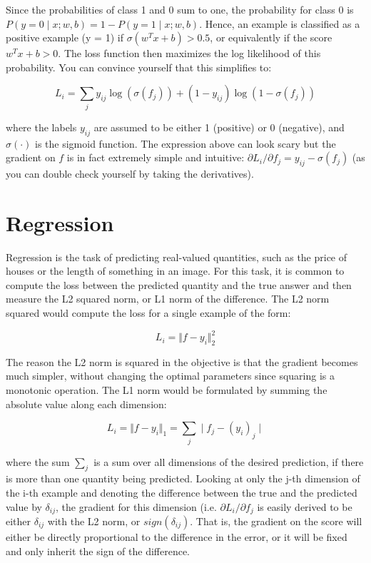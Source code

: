Since the probabilities of class 1 and 0 sum to one, the probability for class 0 is $P(y = 0 \mid x; w, b) = 1 - P(y = 1 \mid x; w,b)$. Hence, an example is classified as a positive example (y = 1) if $\sigma (w^Tx + b) > 0.5$, or equivalently if the score $w^Tx +b > 0$. The loss function then maximizes the log likelihood of this probability. You can convince yourself that this simplifies to:

\begin{equation}
L_i = \sum_j y_{ij} \log(\sigma(f_j)) + (1 - y_{ij}) \log(1 - \sigma(f_j))
\end{equation}

where the labels $y_{ij}$ are assumed to be either 1 (positive) or 0 (negative), and $\sigma(\cdot)$ is the sigmoid function. The expression above can look scary but the gradient on $f$ is in fact extremely simple and intuitive: $\partial{L_i} / \partial{f_j} = y_{ij} - \sigma(f_j)$ (as you can double check yourself by taking the derivatives).

\section*{Regression}
Regression is the task of predicting real-valued quantities, such as the price of houses or the length of something in an image. For this task, it is common to compute the loss between the predicted quantity and the true answer and then measure the L2 squared norm, or L1 norm of the difference. The L2 norm squared would compute the loss for a single example of the form:

\begin{equation}
L_i = \Vert f - y_i \Vert_2^2
\end{equation}

The reason the L2 norm is squared in the objective is that the gradient becomes much simpler, without changing the optimal parameters since squaring is a monotonic operation. The L1 norm would be formulated by summing the absolute value along each dimension:

\begin{equation}
L_i = \Vert f - y_i \Vert_1 = \sum_j \mid f_j - (y_i)_j \mid
\end{equation}

where the sum $\sum_j$ is a sum over all dimensions of the desired prediction, if there is more than one quantity being predicted. Looking at only the j-th dimension of the i-th example and denoting the difference between the true and the predicted value by $\delta_{ij}$, the gradient for this dimension (i.e. $\partial{L_i} / \partial{f_j}$ is easily derived to be either $\delta_{ij}$ with the L2 norm, or $sign(\delta_{ij})$. That is, the gradient on the score will either be directly proportional to the difference in the error, or it will be fixed and only inherit the sign of the difference.

